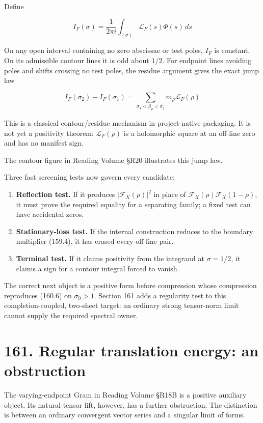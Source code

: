 \documentclass[
  11pt,
]{book}
\providecommand{\tightlist}{%
  \setlength{\itemsep}{0pt}\setlength{\parskip}{0pt}}
\begin{document}
Define

\[
I_F(\sigma)=\frac1{2\pi i}\int_{(\sigma)}
\mathscr L_F(s)\Phi(s)\,ds
\tag{160.8}
\]

On any open interval containing no zero abscissae or test poles, \(I_F\)
is constant. On its admissible contour lines it is odd about \(1/2\).
For endpoint lines avoiding poles and shifts crossing no test poles, the
residue argument gives the exact jump law

\[
\boxed{
I_F(\sigma_2)-I_F(\sigma_1)
=\sum_{\sigma_1<\beta_\rho<\sigma_2}
m_\rho\mathscr L_F(\rho)}
\tag{160.9}
\]

This is a classical contour/residue mechanism in project-native
packaging. It is not yet a positivity theorem: \(\mathscr L_F(\rho)\) is
a holomorphic square at an off-line zero and has no manifest sign.

The contour figure in Reading Volume §R20 illustrates this jump law.

Three fast screening tests now govern every candidate:

\begin{enumerate}
\def\labelenumi{\arabic{enumi}.}
\tightlist
\item
  \textbf{Reflection test.} If it produces \(|\mathcal F_X(\rho)|^2\) in
  place of \(\mathcal F_X(\rho)\mathcal F_X(1-\rho)\), it must prove the
  required equality for a separating family; a fixed test can have
  accidental zeros.
\item
  \textbf{Stationary-loss test.} If the internal construction reduces to
  the boundary multiplier (159.4), it has erased every off-line pair.
\item
  \textbf{Terminal test.} If it claims positivity from the integrand at
  \(\sigma=1/2\), it claims a sign for a contour integral forced to
  vanish.
\end{enumerate}

The correct next object is a positive form before compression whose
compression reproduces (160.6) on \(\sigma_0>1\). Section 161 adds a
regularity test to this completion-coupled, two-sheet target: an
ordinary strong tensor-norm limit cannot supply the required spectral
owner.

\section{161. Regular translation energy: an
obstruction}\label{regular-translation-energy-an-obstruction}

The varying-endpoint Gram in Reading Volume §R18B is a positive
auxiliary object. Its natural tensor lift, however, has a further
obstruction. The distinction is between an ordinary convergent vector
series and a singular limit of forms.
\end{document}
